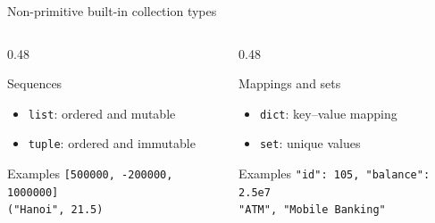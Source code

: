 \documentclass[aspectratio=169]{beamer}
\begin{document}
\begin{frame}{Non-primitive built-in collection types}
  \small
  \begin{columns}[T]
    \begin{column}{0.48\textwidth}
      \begin{block}{Sequences}
        \begin{itemize}
          \item \texttt{list}: ordered and mutable
          \item \texttt{tuple}: ordered and immutable
        \end{itemize}
      \end{block}
      \begin{exampleblock}{Examples}
        \texttt{[500000, -200000, 1000000]}\\[0.3em]
        \texttt{("Hanoi", 21.5)}
      \end{exampleblock}
    \end{column}
    \begin{column}{0.48\textwidth}
      \begin{block}{Mappings and sets}
        \begin{itemize}
          \item \texttt{dict}: key--value mapping
          \item \texttt{set}: unique values
        \end{itemize}
      \end{block}
      \begin{exampleblock}{Examples}
        \texttt{"id": 105, "balance": 2.5e7}\\[0.3em]
        \texttt{"ATM", "Mobile Banking"}
      \end{exampleblock}
    \end{column}
  \end{columns}
\end{frame}
\end{document}
